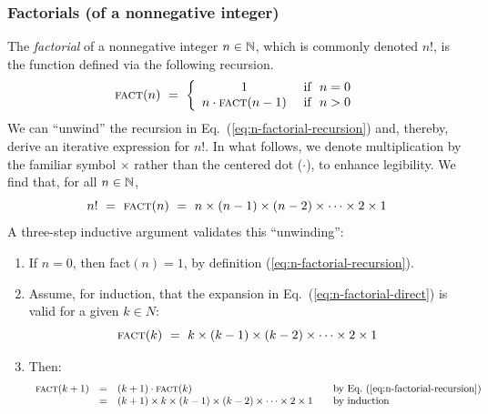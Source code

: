 \subsubsection{Factorials (of a nonnegative integer)}
\label{sec:factorial-function}


The {\it factorial} of a nonnegative integer $n \in \mathbb{N}$, which is commonly denoted $n!$, is the function defined via the following recursion.
\begin{equation}
\label{eq:n-factorial-recursion}
\mbox{\sc fact}(n) \ = \ \left\{
\begin{array}{cl}
1 & \mbox{  if } \ n=0 \\
n \cdot \mbox{\sc fact}(n-1) & \mbox{  if } \ n>0
\end{array}
\right.
\end{equation}
We can ``unwind'' the recursion in Eq.~(\ref{eq:n-factorial-recursion}) and, thereby, derive an iterative expression for $n!$.  In what follows, we denote multiplication by the familiar symbol $\times$ rather than the centered dot ($\cdot$), to enhance legibility.  We find that, for all $n \in \mathbb{N}$,
\begin{equation}
\label{eq:n-factorial-direct}
n! \ = \ \mbox{\sc fact}(n) \ = \ 
n \times (n-1) \times (n-2) \times \cdots \times 2 \times 1
\end{equation} 
A three-step inductive argument validates this ``unwinding'':
\begin{enumerate}
\item
If $n =0$, then {\sc fact}$(n) = 1$, by definition (\ref{eq:n-factorial-recursion}).
\medskip\item
Assume, for induction, that the expansion in Eq.~(\ref{eq:n-factorial-direct}) is valid for a given $k \in N$:
\[ \mbox{\sc fact}(k) \ = \ k \times (k-1) \times (k-2) \times \cdots \times 2 \times 1 \] 
\medskip\item
Then:
\[
\begin{array}{lclll}
\mbox{\sc fact}(k+1) & = & (k+1) \cdot \mbox{\sc fact}(k)
  & & \mbox{by Eq.~(\ref{eq:n-factorial-recursion})} \\
  & = &
(k+1) \times k \times (k-1) \times (k-2) \times \cdots \times 2 \times 1
  & & \mbox{by induction}
\end{array}
\]
\end{enumerate}


